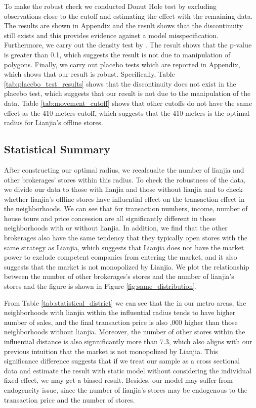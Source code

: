 \documentclass[11pt]{article}
\begin{document}
To make the robust check we conducted Donut Hole test by excluding observations close to the cutoff and estimating the effect with the remaining data. The results are shown in Appendix and the result shows that the discontinuity still exists and this provides evidence against a model misspecification. Furthermore, we carry out the density test by \citep{MCCRARY2008698}. The result shows that the p-value is greater than 0.1, which suggests the result is not due to manipulation of polygons. Finally, we carry out placebo tests which are reported in Appendix, which shows that our result is robust. Specifically, Table \ref{tab:placebo_test_results} shows that the discontinuity does not exist in the placebo test, which suggests that our result is not due to the manipulation of the data. Table \ref{tab:movement_cutoff} shows that other cutoffs do not have the same effect as the 410 meters cutoff, which suggests that the 410 meters is the optimal radius for Lianjia's offline stores.

\subsection{Statistical Summary} \label{subsec:Statistical_Summary}

After constructing our optimal radius, we recalcualte the number of lianjia and other brokerages' stores within this radius. To check the robustness of the data, we divide our data to those with lianjia and those without lianjia and to check whether lianjia's offline stores have influential effect on the transaction effect in the neighborhoods. We can see that for transaction numbers, income, number of house tours and price concession are all significantly different in those neighborhoods with or without lianjia. In addition, we find that the other brokerages also have the same tendency that they typically open stores with the same strategy as Lianjia, which suggests that Lianjia does not have the market power to exclude competent companies from entering the market, and it also suggests that the market is not monopolized by Lianjia. We plot the relationship between the number of other brokerages's stores and the number of lianjia's stores and the figure is shown in Figure \ref{fig:same_distribution}.

From Table \ref{tab:statistical_district} we can see that the in our metro areas, the neighborhoods with lianjia within the influential radius tends to have higher number of sales, and the final transaction price is also ,000 higher than those neighborhoods without lianjia. Moreover, the number of other stores within the influential distance is also signnificantly more than 7.3, which also aligns with our previous intuition that the market is not monopolized by Lianjia. This significance difference suggests that if we treat our sample as a cross sectional data and estimate the result with static model without considering the individual fixed effect, we may get a biased result. Besides, our model may suffer from endogeneity issue, since the number of lianjia's stores may be endogenous to the transaction price and the number of stores. 
\end{document}
